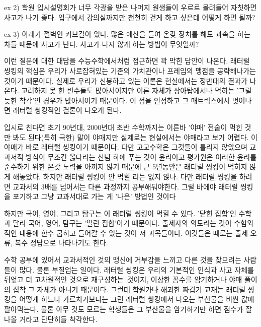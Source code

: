 ex 2) 학원 입시설명회가 너무 각광을 받은 나머지 원생들이 우르르 몰려들어 자칫하면 사고가 나기 좋다.
입구에서 강의실까지만 천천히 걷게 하고 싶은데 어떻게 하면 될까?
\vspace{5mm}

ex 3) 아래가 절벽인 커브길이 있다. 많은 예산을 들여 온갖 장치를 해도 과속을 하는 차들 때문에 사고가 난다.
사고가 나지 않게 하는 방법이 무엇일까?
\vspace{5mm}

이런 질문에 대한 대답을 수능수학에서처럼 접근하면 꽉 막힌 답안이 나온다.
래터럴 씽킹의 핵심은 우리가 사로잡혀있는 기존의 가치관이나 프레임의 맹점을 공략해나가는 것이기 때문이다.
실제로 우리가 신봉하고 있는 이론은 현실에서는 정반대의 결과가 나온다. 고려하지 못 한 변수들도 많아서이지만
이론 자체가 상아탑에서나 먹히는 '그럴 듯한 착각'인 경우가 많아서이기 때문이다.
이 점을 인정하고 그 매트릭스에서 벗어나면 래터럴 씽킹적인 결론이 나오게 된다.
\vspace{5mm}

입시로 친다면 초기 90년대, 2000년대 초반 수학까지는 이른바 '야매' 전술이 먹힌 것만 봐도 된다(특히 극한)
말이 야매지만 실제로는 현실에서는 야매라고 보기 어렵다. 이 야매가 바로 래터럴 씽킹이기 때문이다.
다만 고교수학은 그것들이 틀리지 않았으며 교과서적 방식이 무조건 옳다라는 신념 하에 푸는 것이 윤리이고
평가원은 이러한 윤리를 준수하기 위한 온갖 노력을 아끼지 않기 때문에 근 5년동안은 래터럴 씽킹이 먹히지 않게 해놓았다.
하지만 래터럴 씽킹이 안 먹힐 리는 없지 않나. 다만 래터럴 씽킹을 하려면 교과서의 3배를 넘어서는 다른 과정까지 공부해둬야한다.
그럴 바에야 래터럴 씽킹을 포기하고 그냥 교과서대로 가는 게 '나은' 방법인 것이다
\vspace{5mm}

하지만 국어, 영어, 그리고 탐구는 이 래터럴 씽킹이 먹힐 수 있다.
'닫힌 집합'인 수학과 달리 국어, 영어, 탐구는 '열린 집합'이기 때문이다.
출제자의 의도라는 것이 수험외적인 내용에 한수 굽히고 들어갈 수 있는 것이 저 과목들이다.
이것들은 때로는 출제 오류, 복수 정답으로 나타나기도 한다.
\vspace{5mm}

수학 공부에 있어서 교과서적인 것의 맹신에 거부감을 느끼고 다른 것을 찾으려는 사람들이 많다.
물론 부질업는 일이다. 래터럴 씽킹은 우리의 기본적인 인식과 사고 자체를 뒤엎고 더 고차원적인 것으로 재구성하는 것이지,
이상한 꼼수를 암기하거나 야매 풀이의 집착 그 자체가 아니기 때문이다.
그런데 학원가나 해괴한 짜깁기 교재는 래터럴 씽킹을 어떻게 하느냐 가르치기보다는
그런 래터럴 씽킹에서 나오는 부산물을 비싼 값에 팔아먹는다.
물론 아무 것도 모르는 학생들은 그 부산물을 암기하기만 하면 점수가 잘 나올 거라고 단단히들 착각한다.
\vspace{5mm}

